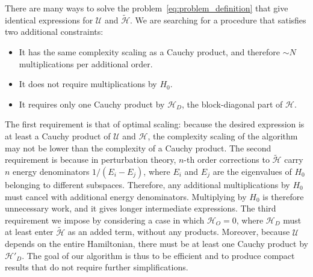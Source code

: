 There are many ways to solve the problem~\eqref{eq:problem_definition} that give identical expressions for $\mathcal{U}$ and $\tilde{\mathcal{H}}$.
We are searching for a procedure that satisfies two additional constraints:
%
\begin{itemize}
    \item It has the same complexity scaling as a Cauchy product, and therefore
    $\sim N$ multiplications per additional order.
    \item It does not require multiplications by $H_0$.
    \item It requires only one Cauchy product by $\mathcal{H}_D$, the block-diagonal
    part of $\mathcal{H}$.
\end{itemize}
%
The first requirement is that of optimal scaling: because the desired expression is at least a Cauchy product of $\mathcal{U}$ and $\mathcal{H}$, the complexity scaling of the algorithm may not be lower than the complexity of a Cauchy product.
The second requirement is because in perturbation theory, $n$-th order corrections to $\tilde{\mathcal{H}}$ carry $n$ energy denominators $1/(E_i - E_j)$, where $E_i$ and $E_j$ are the eigenvalues of $H_0$ belonging to different subspaces.
Therefore, any additional multiplications by $H_0$ must cancel with additional energy denominators.
Multiplying by $H_0$ is therefore unnecessary work, and it gives longer intermediate expressions.
The third requirement we impose by considering a case in which $\mathcal{H}_{O}=0$, where $\mathcal{H}_D$ must at least enter $\tilde{\mathcal{H}}$ as an added term, without any products.
Moreover, because $\mathcal{U}$ depends on the entire Hamiltonian, there must be at least one Cauchy product by $\mathcal{H}'_D$.
The goal of our algorithm is thus to be efficient and to produce compact results that do not require further simplifications.

